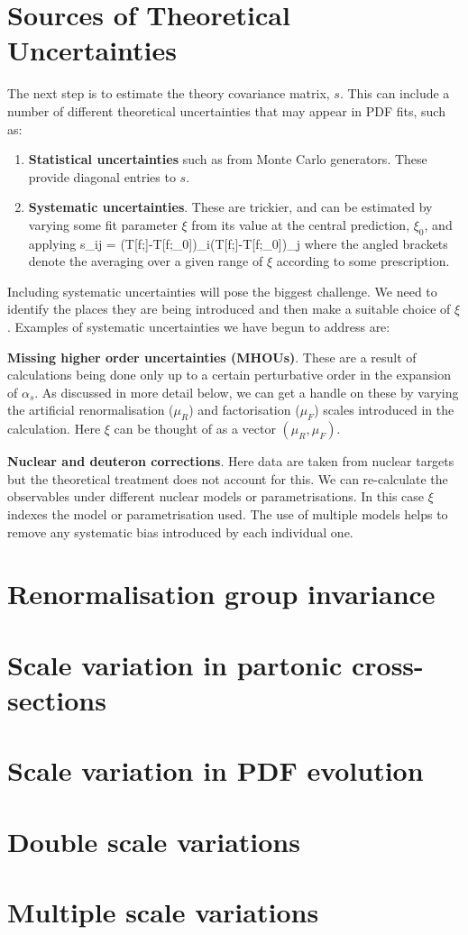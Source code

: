 \section{Sources of Theoretical Uncertainties}

The next step is to estimate the theory covariance matrix, $s$. This can include a number of different theoretical uncertainties that may appear in PDF fits, such as:

\begin{enumerate}
    \item \textbf{Statistical uncertainties} such as from Monte Carlo generators. These provide diagonal entries to $s$.
    \item \textbf{Systematic uncertainties}. These are trickier, and can be estimated by varying some fit parameter $\xi$ from its value at the central prediction, $\xi_0$, and applying 
        \beq
        s_{ij} = \langle(T[f;\xi]-T[f;\xi_0])_i(T[f;\xi]-T[f;\xi_0])_j\rangle
        \label{theoryunc}
    \eeq
        where the angled brackets denote the averaging over a given range of $\xi$ according to some prescription.
\end{enumerate}
Including systematic uncertainties will pose the biggest challenge. We need to identify the
places they are being introduced and then make a suitable choice of $\xi$. Examples of
systematic uncertainties we have begun to address are:
    \bi
    \item \textbf{Missing higher order uncertainties (MHOUs)}. These are a result of calculations
      being done only up to a certain perturbative order in the expansion of $\alpha_s$.
      As discussed in more detail below, we can get a handle on these by varying the artificial
      renormalisation ($\mu_R$) and factorisation ($\mu_F$) scales introduced in the calculation.
      Here $\xi$ can be thought of as a vector $(\mu_R, \mu_F)$.
    \item \textbf{Nuclear and deuteron corrections}. Here data are taken from nuclear targets
      but the theoretical treatment does not account for this. We can re-calculate the
      observables under different nuclear models or parametrisations. In this case $\xi$
      indexes the model or parametrisation used. The use of multiple models helps to remove
      any systematic bias introduced by each individual one.
    \ei
\section{Renormalisation group invariance}
\section{Scale variation in partonic cross-sections}
\section{Scale variation in PDF evolution}
\section{Double scale variations}
\section{Multiple scale variations}